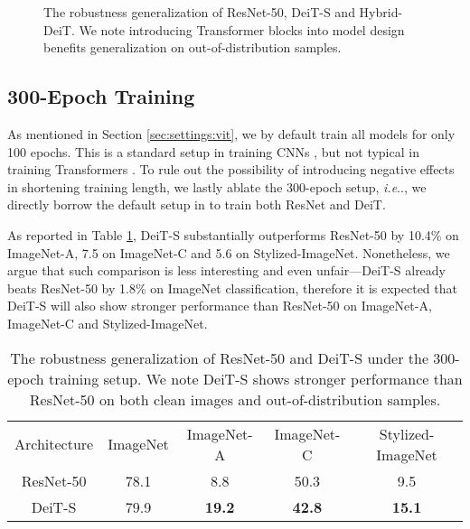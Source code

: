 \documentclass{article}
\makeatletter
\DeclareRobustCommand\onedot{\futurelet\@let@token\@onedot}
\def\@onedot{\ifx\@let@token.\else.\null\fi\xspace}
\def\ie{\emph{i.e}\onedot} \def\Ie{\emph{I.e}\onedot}
\makeatother
\begin{document}
\begin{figure}[h!]
\centering
\vspace{-0.3em}
\vspace{-0.5em}
    \caption{The robustness generalization of ResNet-50, DeiT-S and Hybrid-DeiT. We note introducing Transformer blocks into model design benefits generalization on out-of-distribution samples.}
    \label{fig:hybrid}
    \vspace{-0.2em}
\end{figure}



\subsection{300-Epoch Training}
As mentioned in Section \ref{sec:settings:vit}, we by default train all models for only 100 epochs. This is a standard setup in training CNNs \cite{goyal2017accurate,radosavovic2020designing}, but not typical in training Transformers \cite{pmlr-v139-touvron21a,liu2021swin}. To rule out the possibility of introducing negative effects in shortening training length, we lastly ablate the 300-epoch setup, \ie, we directly borrow the default  setup in \cite{pmlr-v139-touvron21a} to train both ResNet and DeiT.

As reported in Table \ref{tab:same}, DeiT-S substantially outperforms ResNet-50 by 10.4\% on ImageNet-A, 7.5 on ImageNet-C and 5.6 on Stylized-ImageNet. Nonetheless, we argue that such comparison is less interesting and even unfair---DeiT-S already beats ResNet-50 by 1.8\% on ImageNet classification, therefore it is expected that DeiT-S will also show stronger performance than ResNet-50 on ImageNet-A, ImageNet-C and Stylized-ImageNet.


\begin{table}[!ht]
\footnotesize
\centering
\vspace{-0.4em}
\caption{The robustness generalization of ResNet-50 and DeiT-S under the 300-epoch training setup. We note DeiT-S shows stronger performance than ResNet-50 on both clean images and out-of-distribution samples.}
\begin{tabular}{c|c|c|c|c}
\shline
 Architecture & ImageNet \textcolor{red}{} & ImageNet-A \textcolor{red}{}& ImageNet-C \textcolor{red}{}& Stylized-ImageNet \textcolor{red}{}\\ 
 \shline
 ResNet-50  &  78.1	& 8.8	& 50.3	& 9.5   \\  
 DeiT-S &  79.9	& \textbf{19.2} & 	\textbf{42.8} & 	\textbf{15.1}    \\ \hline 
\end{tabular}
\vspace{-0.1em}
\label{tab:same}
\end{table}
\end{document}
